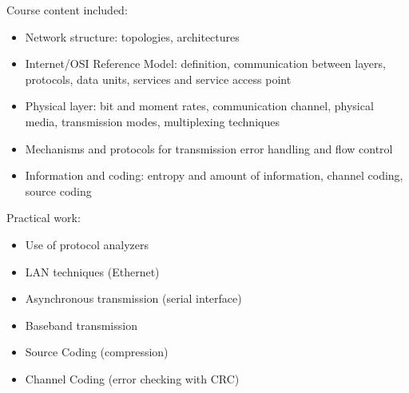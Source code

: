 Course content included:
\begin{itemize}
    \item Network structure: topologies, architectures
    \item Internet/OSI Reference Model: definition, communication between layers, protocols, data units, services and service access point
    \item Physical layer: bit and moment rates, communication channel, physical media, transmission modes, multiplexing techniques
    \item Mechanisms and protocols for transmission error handling and flow control
    \item Information and coding: entropy and amount of information, channel coding, source coding
\end{itemize}
Practical work:
\begin{itemize}
    \item Use of protocol analyzers
    \item LAN techniques (Ethernet)
    \item Asynchronous transmission (serial interface)
    \item Baseband transmission
    \item Source Coding (compression)
    \item Channel Coding (error checking with CRC)
\end{itemize}